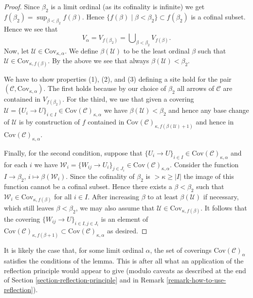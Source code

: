 \begin{proof}
\medskip\noindent
Since $\beta_2$ is a limit ordinal (as its cofinality is infinite)
we get $f(\beta_2) = \sup_{\beta < \beta_2} f(\beta)$.
Hence $\{f(\beta) \mid \beta < \beta_2\} \subset f(\beta_2)$ is a
cofinal subset. Hence we see that
$$
V_\alpha = V_{f(\beta_2)} = \bigcup\nolimits_{\beta < \beta_2} V_{f(\beta)}.
$$
Now, let $\mathcal{U} \in \text{Cov}_{\kappa, \alpha}$.
We define $\beta(\mathcal{U})$ to be the least ordinal $\beta$ such that
$\mathcal{U} \in \text{Cov}_{\kappa, f(\beta)}$. By the above we see
that always $\beta(\mathcal{U}) < \beta_2$.

\medskip\noindent
We have to show properties (1), (2), and (3) defining a site
hold for the pair $(\mathcal{C}, \text{Cov}_{\kappa, \alpha})$.
The first holds because by our choice of $\beta_2$
all arrows of $\mathcal{C}$ are contained in $V_{f(\beta_2)}$.
For the third, we use that given a covering
$\mathcal{U} = \{U_i \to U\}_{i \in I}
\in \text{Cov}(\mathcal{C})_{\kappa, \alpha}$
we have $\beta(\mathcal{U}) < \beta_2$ and hence
any base change of $\mathcal{U}$ is by construction of
$f$ contained in $\text{Cov}(\mathcal{C})_{\kappa, f(\beta(\mathcal{U}) + 1)}$
and hence in $\text{Cov}(\mathcal{C})_{\kappa, \alpha}$.

\medskip\noindent
Finally, for the second condition, suppose that $\{U_i \to U\}_{i\in I}
\in \text{Cov}(\mathcal{C})_{\kappa, \alpha}$
and for each $i$ we have
$\mathcal{W}_i = \{W_{ij} \to U_i\}_{j\in J_i}
\in \text{Cov}(\mathcal{C})_{\kappa, \alpha}$.
Consider the function
$I \to \beta_2$, $i \mapsto \beta(\mathcal{W}_i)$. Since the cofinality
of $\beta_2$ is $> \kappa \geq |I|$ the image of this function cannot be a
cofinal subset. Hence there exists a $\beta < \beta_2$ such
that $\mathcal{W}_i \in \text{Cov}_{\kappa, f(\beta)}$ for all $i \in I$.
After increasing $\beta$ to at least $\beta(\mathcal{U})$ if necessary,
which still leaves $\beta < \beta_2$, we may also assume that
$\mathcal{U} \in \text{Cov}_{\kappa, f(\beta)}$.
It follows that the covering $\{W_{ij} \to U\}_{i\in I, j \in J_i}$
is an element of $\text{Cov}(\mathcal{C})_{\kappa, f(\beta + 1)}
\subset \text{Cov}(\mathcal{C})_{\kappa, \alpha}$ as desired.
\end{proof}

\begin{remark}
\label{remark-better}
It is likely the case that, for some limit ordinal $\alpha$,
the set of coverings $\text{Cov}(\mathcal{C})_\alpha$ satisfies
the conditions of the lemma. This is after all what an application
of the reflection principle would appear to give (modulo caveats as
described at the end of Section \ref{section-reflection-principle}
and in Remark \ref{remark-how-to-use-reflection}).
\end{remark}








